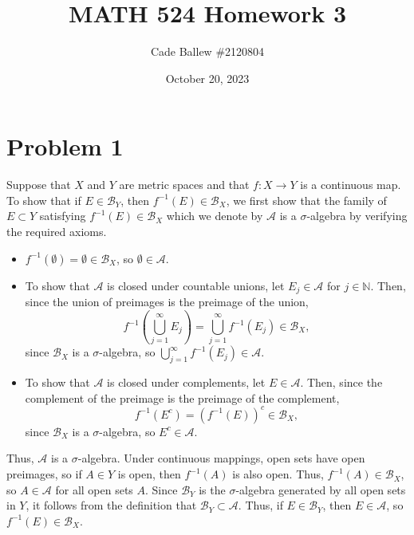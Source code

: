 \documentclass{article}
\title{MATH 524 Homework 3}
\author{Cade Ballew \#2120804}
\date{October 20, 2023}
\begin{document}
	
\maketitle
	
\section{Problem 1}
Suppose that $X$ and $Y$ are metric spaces and that $f:X\to Y$ is a continuous map. To show that if $E\in\mathcal B_Y$, then $f^{-1}(E)\in\mathcal B_X$, we first show that the family of $E\subset Y$ satisfying $f^{-1}(E)\in\mathcal B_X$ which we denote by $\mathcal A$ is a $\sigma$-algebra by verifying the required axioms. 
\begin{itemize}
	\item $f^{-1}(\emptyset)=\emptyset\in\mathcal B_X$, so $\emptyset\in\mathcal A$. 
	\item To show that $\mathcal A$ is closed under countable unions, let $E_j\in\mathcal A$ for $j\in\mathbb{N}$. Then, since the union of preimages is the preimage of the union,
	\[
	f^{-1}\left(\bigcup_{j=1}^\infty E_j\right)=\bigcup_{j=1}^\infty f^{-1}\left( E_j\right)\in\mathcal{B}_X,
	\]
	since $\mathcal{B}_X$ is a $\sigma$-algebra, so $\bigcup_{j=1}^\infty f^{-1} (E_j)\in\mathcal A$. 
	\item To show that $\mathcal A$ is closed under complements, let $E\in\mathcal{A}$. Then, since the complement of the preimage is the preimage of the complement,
	\[
	f^{-1}\left(E^c\right)=\left(f^{-1}(E)\right)^c\in\mathcal{B}_X,
	\]
	since $\mathcal{B}_X$ is a $\sigma$-algebra, so $E^c\in\mathcal A$.
\end{itemize}
Thus, $\mathcal A$ is a $\sigma$-algebra. Under continuous mappings, open sets have open preimages, so if $A\in Y$ is open, then $f^{-1}(A)$ is also open. Thus, $f^{-1}(A)\in\mathcal B_X$, so $A\in\mathcal A$ for all open sets $A$. Since $\mathcal B_Y$ is the $\sigma$-algebra generated by all open sets in $Y$, it follows from the definition that $\mathcal B_Y\subset\mathcal A$. Thus, if $E\in\mathcal B_Y$, then $E\in\mathcal A$, so $f^{-1}(E)\in\mathcal B_X$.
\end{document}
